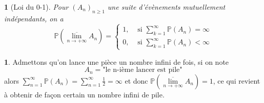 \documentclass[8pt,notheorems]{beamer}
\def \P {\mathbb P}
\def \limsup{\underset{n\rightarrow+\infty}{\overline{\lim}}}
\newtheorem{theorem}{\translate{Theorem}}[section]
\newtheorem{theorem}{\translate{Theoreme}}
\theoremstyle{definition}
\theoremstyle{example}
\newtheorem{example}{\translate{Exemple}}
\theoremstyle{mystyle}
\theoremstyle{plain}
\begin{document}
\begin{frame}[allowframebreaks]
\begin{theorem}[Loi du 0-1]
Pour $(A_n)_{n\geq 1}$ une suite d'évènements mutuellement indépendants, on a 
$$\P\left(\limsup A_n\right) = \begin{cases}1,&\text{  si }\sum_{k = 1}^{\infty}\P(A_n) = \infty\\
0,& \text{ si }\sum_{k = 1}^{\infty}\P(A_n) < \infty
\end{cases}$$
\end{theorem}
\begin{example}
Admettons qu'on lance une pièce un nombre infini de fois, si on note 
$$
A_n = \text{"le n-ième lancer est pile"}
$$
alors $\sum_{n = 1}^{\infty}\P(A_n) = \sum_{n = 1}^{\infty}\frac{1}{2} = \infty$ et donc $\P(\limsup A_n) = 1$, ce qui revient à obtenir de façon certain un nombre infini de pile. 
\end{example}
\end{frame}
\end{document}
